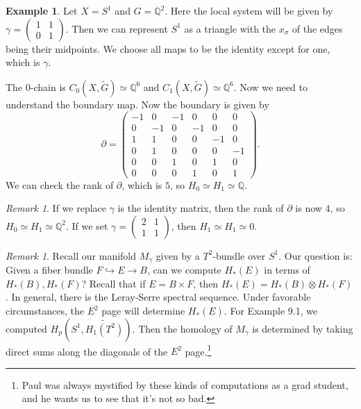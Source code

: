 \documentclass[leqno, openany]{memoir}
\theoremstyle{definition}
\newtheorem{exm}[thm]{Example}
\theoremstyle{remark}
\newtheorem{rmk}[thm]{Remark}
\theoremstyle{plain}
\theoremstyle{definition}
\theoremstyle{remark}
\newcommand{\Q}{\mathbb{Q}}
\begin{document}
\begin{exm} Let $X = S^1$ and $G = \Q^2$. Here the local system will be given
    by $ \gamma =  \begin{pmatrix} 1 & 1 \\0 & 1 \end{pmatrix} $. Then we can
    represent $S^1$ as a triangle with the $x_{\sigma}$ of the edges being
    their midpoints. We choose all maps to be the identity except for one,
    which is $\gamma$.

    The $0$-chain is $C_0(X, \widetilde{G}) \simeq \Q^6$ and $C_1(X,
    \widetilde{G}) \simeq \Q^6$. Now we need to understand the boundary map.
    Now the boundary is given by \[ \partial = \begin{pmatrix} -1 & 0  & -1 & 0
    & 0  & 0  \\ 0 & -1 & 0  & -1 & 0  & 0  \\ 1  & 1  & 0  & 0  & -1 & 0  \\ 0
    & 1  & 0  & 0  & 0  & -1 \\ 0  & 0  & 1  & 0  & 1  & 0  \\ 0  & 0  & 0  & 1
    & 0  & 1 \end{pmatrix}. \] We can check the rank of $\partial$, which is
    $5$, so $H_0 \simeq H_1 \simeq \Q$.  \end{exm}

\begin{rmk} If we replace $\gamma$ is the identity matrix, then the rank of
    $\partial$ is now $4$, so $H_0 \simeq H_1 \simeq \Q^2$. If we set $\gamma =
    \begin{pmatrix} 2 & 1 \\1 & 1 \end{pmatrix}$, then $H_1 \simeq H_1 \simeq
0$.  \end{rmk}

\begin{rmk} Recall our manifold $M_{\gamma}$ given by a $T^2$-bundle over
    $S^1$. Our question is: Given a fiber bundle $F \hookrightarrow E \to B$,
    can we compute $H_*(E)$ in terms of $H_*(B), H_*(F)$? Recall that if $E = B
    \times F$, then $H_*(E) = H_*(B) \otimes H_*(F)$. In general, there is the
    Leray-Serre spectral sequence. Under favorable circumstances, the $E^2$
    page will determine $H_*(E)$. For Example 9.1, we computed $H_p(S^1,
    \widetilde{H_1(T^2)})$. Then the homology of $M_{\gamma}$ is determined by
    taking direct sums along the diagonals of the $E^2$ page.\footnote{Paul was
    always mystified by these kinds of computations as a grad student, and he
wants us to see that it's not so bad.} \end{rmk}
\end{document}
